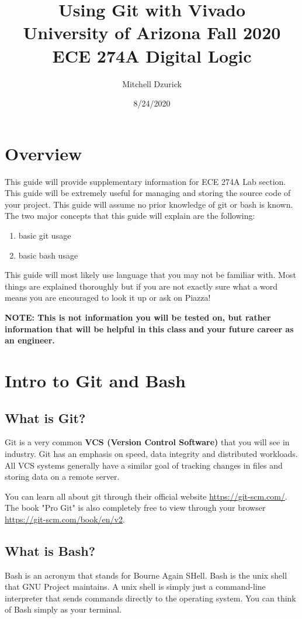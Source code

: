 \documentclass[12pt]{article}
\title {{\bf Using Git with Vivado} \\
\large{University of Arizona Fall 2020 ECE 274A Digital Logic}}
\author{Mitchell Dzurick}
\date{8/24/2020}
\begin{document}
\maketitle

\tableofcontents
\listoffigures
\clearpage


\section{Overview} \label{Overview}
This guide will provide supplementary information for ECE 274A Lab section. This guide will be extremely useful for managing and storing the source code of your project. This guide will assume no prior knowledge of git or bash is known. The two major concepts that this guide will explain are the following:
\begin{enumerate}
    \item basic git usage
    \item basic bash usage
\end{enumerate}

This guide will most likely use language that you may not be familiar with. Most things are explained thoroughly but if you are not exactly sure what a word means you are encouraged to look it up or ask on Piazza!

\textbf{NOTE: This is not information you will be tested on, but rather information that will be helpful in this class and your future career as an engineer.}

\section{Intro to Git and Bash} \label{Intro to Git}
\subsection{What is Git?}
Git is a very common \textbf{VCS (Version Control Software)} that you will see in industry. Git has an emphasis on speed, data integrity and distributed workloads. All VCS systems generally have a similar goal of tracking changes in files and storing data on a remote server.

You can learn all about git through their official website \href{https://git-scm.com/}{https://git-scm.com/}. The book "Pro Git" is also completely free to view through your browser \href{https://git-scm.com/book/en/v2}{https://git-scm.com/book/en/v2}.

\subsection{What is Bash?}
Bash is an acronym that stands for Bourne Again SHell. Bash is the unix shell that GNU Project maintains. A unix shell is simply just a command-line interpreter that sends commands directly to the operating system. You can think of Bash simply as your terminal.
\end{document}
